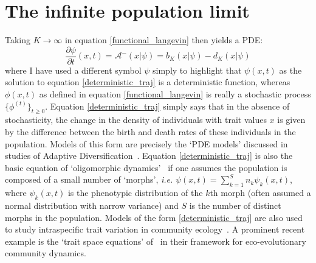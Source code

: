 \section{The infinite population limit}
Taking $K \to \infty$ in equation \eqref{functional_langevin} then yields a PDE:
\begin{equation}
\label{deterministic_traj}
\frac{\partial \psi}{\partial t}(x,t) = \mathcal{A}^{-}\left(x|\psi\right) = b_K(x|\psi)- d_K(x|\psi)
\end{equation}
where I have used a different symbol $\psi$ simply to highlight that $\psi(x,t)$ as the solution to equation \eqref{deterministic_traj} is a deterministic function, whereas $\phi(x,t)$ as defined in equation \eqref{functional_langevin} is really a stochastic process $\{\phi^{(t)}\}_{t\geq0}$. Equation \eqref{deterministic_traj} simply says that in the absence of stochasticity, the change in the density of individuals with trait values $x$ is given by the difference between the birth and death rates of these individuals in the population. Models of this form are precisely the `PDE models' discussed in studies of Adaptive Diversification~\citep{doebeli_adaptive_2011}. Equation \eqref{deterministic_traj} is also the basic equation of `oligomorphic dynamics'~\citep{sasaki_oligomorphic_2011, lion_multimorph_2022} if one assumes the population is composed of a small number of `morphs', \emph{i.e.} $\psi(x,t) = \sum\limits_{k=1}^{S} n_{k}\psi_k(x,t)$, where $\psi_k(x,t)$ is the phenotypic distribution of the $k$th morph (often assumed a normal distribution with narrow variance) and $S$ is the number of distinct morphs in the population. Models of the form \eqref{deterministic_traj} are also used to study intraspecific trait variation in community ecology~\citep{nordbotten_dynamics_2020}. A prominent recent example is the `trait space equations' of~\citep{wickman_theoretical_2022} in their framework for eco-evolutionary community dynamics.

